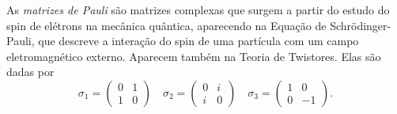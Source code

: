 \documentclass[11pt,a4paper]{article}
\begin{document}
\begin{exercicio}
As \emph{matrizes de Pauli} são matrizes complexas que surgem a partir do estudo do spin de elétrons na mecânica quântica, aparecendo na Equação de Schrödinger-Pauli, que descreve a interação do spin de uma partícula com um campo eletromagnético externo. Aparecem também na Teoria de Twistores. Elas são dadas por
\[
\sigma_1 = \begin{pmatrix}
0 & 1 \\ 1 & 0
\end{pmatrix} \quad  \sigma_2 = \begin{pmatrix}
0 & i \\ i & 0
\end{pmatrix} \quad \sigma_3 = \begin{pmatrix}
1 & 0 \\ 0 & -1
\end{pmatrix}.
\]
    \end{exercicio}
\end{document}
